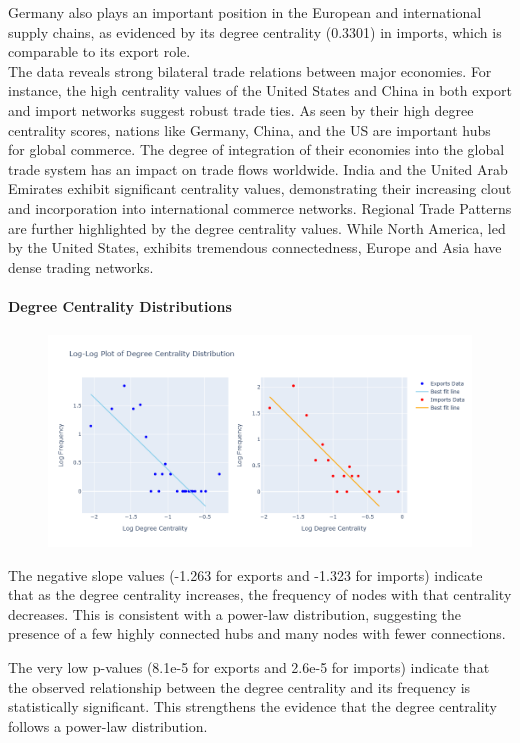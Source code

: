 \documentclass[12pt, a4paper]{article}
\begin{document}
Germany also plays an important position in the European and international supply chains, as evidenced by its degree centrality (0.3301) in imports, which is comparable to its export role.\\
The data reveals strong bilateral trade relations between major economies. For instance, the high centrality values of the United States and China in both export and import networks suggest robust trade ties.
As seen by their high degree centrality scores, nations like Germany, China, and the US are important hubs for global commerce. The degree of integration of their economies into the global trade system has an impact on trade flows worldwide.
India and the United Arab Emirates exhibit significant centrality values, demonstrating their increasing clout and incorporation into international commerce networks.
Regional Trade Patterns  are further highlighted by the degree centrality values. While North America, led by the United States, exhibits tremendous connectedness, Europe and Asia have dense trading networks.\\
\paragraph{Degree Centrality Distributions}
\begin{figure}[ht]
\centering
\includegraphics[scale=0.4]{img/degreedist.png}
\label{fig:degreedist}
\end{figure}
The negative slope values (-1.263 for exports and -1.323 for imports) indicate that as the degree centrality increases, the frequency of nodes with that centrality decreases. This is consistent with a power-law distribution, suggesting the presence of a few highly connected hubs and many nodes with fewer connections.

The very low p-values (8.1e-5 for exports and 2.6e-5 for imports) indicate that the observed relationship between the degree centrality and its frequency is statistically significant. This strengthens the evidence that the degree centrality follows a power-law distribution.
\end{document}
